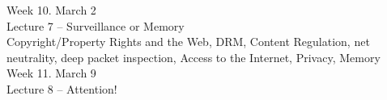 {Week 10. March 2 \\
Lecture 7 – Surveillance or Memory \\
Copyright/Property Rights and the Web, DRM, Content Regulation, net neutrality, deep packet inspection, Access to the Internet, Privacy, Memory \\

Week 11. March 9 \\
Lecture 8 – Attention! \\

%

}
